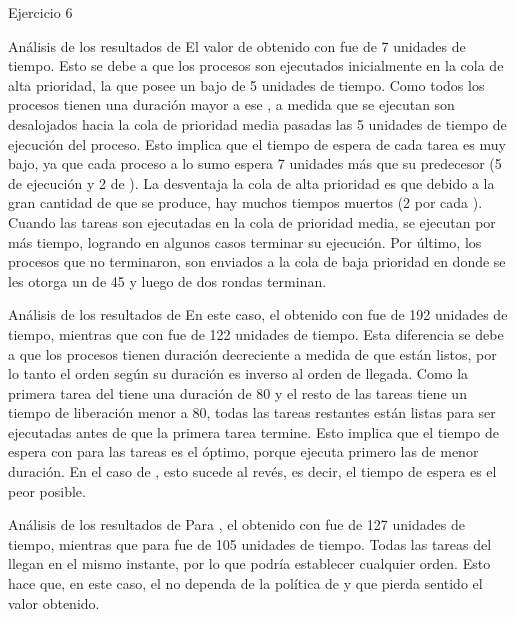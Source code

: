 
\begin{section}{Ejercicio 6}

\begin{subsection}{Análisis de los resultados de }
	El valor de  obtenido con  fue de 7 unidades de tiempo. Esto se debe a que los procesos son ejecutados inicialmente en la cola de alta prioridad, la que posee un  bajo de 5 unidades de tiempo. Como todos los procesos tienen una duración mayor a ese , a medida que se ejecutan son desalojados hacia la cola de prioridad media pasadas las 5 unidades de tiempo de ejecución del proceso. Esto implica que el tiempo de espera de cada tarea es muy bajo, ya que cada proceso a lo sumo espera 7 unidades más que su predecesor (5 de ejecución y 2 de ). La desventaja la cola de alta prioridad es que debido a la gran cantidad de  que se produce, hay muchos tiempos muertos (2 por cada ). Cuando las tareas son ejecutadas en la cola de prioridad media, se ejecutan por más tiempo, logrando en algunos casos terminar su ejecución. Por último, los procesos que no terminaron, son enviados a la cola de baja prioridad en donde se les otorga un  de 45 y luego de dos rondas terminan.
\end{subsection}

\begin{subsection}{Análisis de los resultados de }
	En este caso, el  obtenido con  fue de 192 unidades de tiempo, mientras que con  fue de 122 unidades de tiempo. Esta diferencia se debe a que los procesos tienen duración decreciente a medida de que están listos, por lo tanto el orden según su duración es inverso al orden de llegada. Como la primera tarea del  tiene una duración de 80 y el resto de las tareas tiene un tiempo de liberación menor a 80, todas las tareas restantes están listas para ser ejecutadas antes de que la primera tarea termine. Esto implica que el tiempo de espera con  para las tareas es el óptimo, porque ejecuta primero las de menor duración. En el caso de , esto sucede al revés, es decir, el tiempo de espera es el peor posible.
\end{subsection}

\begin{subsection}{Análisis de los resultados de }
	Para , el  obtenido con  fue de 127 unidades de tiempo, mientras que para  fue de 105 unidades de tiempo. Todas las tareas del  llegan en el mismo instante, por lo que  podría establecer cualquier orden. Esto hace que, en este caso, el  no dependa de la política de  y que pierda sentido el valor obtenido.
\end{subsection}


\end{section}
